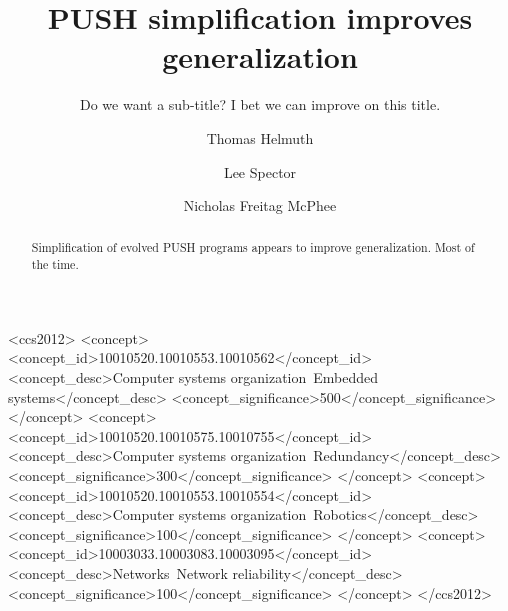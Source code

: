 \documentclass[sigconf]{acmart}
\begin{document}
\title{PUSH simplification improves generalization}
\subtitle{Do we want a sub-title? I bet we can improve on this title.}

\author{Thomas Helmuth}

\author{Lee Spector}

\author{Nicholas Freitag McPhee}



\begin{abstract}
	Simplification of evolved PUSH programs appears to improve generalization.
	Most of the time.
\end{abstract}

%
%
\begin{CCSXML}
<ccs2012>
 <concept>
  <concept_id>10010520.10010553.10010562</concept_id>
  <concept_desc>Computer systems organization~Embedded systems</concept_desc>
  <concept_significance>500</concept_significance>
 </concept>
 <concept>
  <concept_id>10010520.10010575.10010755</concept_id>
  <concept_desc>Computer systems organization~Redundancy</concept_desc>
  <concept_significance>300</concept_significance>
 </concept>
 <concept>
  <concept_id>10010520.10010553.10010554</concept_id>
  <concept_desc>Computer systems organization~Robotics</concept_desc>
  <concept_significance>100</concept_significance>
 </concept>
 <concept>
  <concept_id>10003033.10003083.10003095</concept_id>
  <concept_desc>Networks~Network reliability</concept_desc>
  <concept_significance>100</concept_significance>
 </concept>
</ccs2012>  
\end{CCSXML}




\maketitle




 
\end{document}

